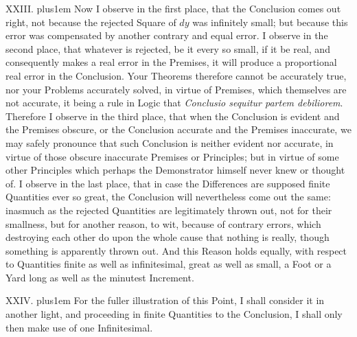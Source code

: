 \medbreak

XXIII. \hskip 0pt plus1em
Now I observe in the first place, that the Conclusion comes out
right, not because the rejected Square of $dy$ was infinitely
small; but because this error was compensated by another contrary
and equal error.  I observe in the second place, that whatever is
rejected, be it every so small, if it be real, and consequently
makes a real error in the Premises, it will produce a
proportional real error in the Conclusion.  Your Theorems
therefore cannot be accurately true, nor your Problems accurately
solved, in virtue of Premises, which themselves are not accurate,
it being a rule in Logic that {\it Conclusio sequitur partem
debiliorem}.  Therefore I observe in the third place, that when
the Conclusion is evident and the Premises obscure, or the
Conclusion accurate and the Premises inaccurate, we may safely
pronounce that such Conclusion is neither evident nor accurate,
in virtue of those obscure inaccurate Premises or Principles; but
in virtue of some other Principles which perhaps the Demonstrator
himself never knew or thought of.  I observe in the last place,
that in case the Differences are supposed finite Quantities ever
so great, the Conclusion will nevertheless come out the same:
inasmuch as the rejected Quantities are legitimately thrown out,
not for their smallness, but for another reason, to wit, because
of contrary errors, which destroying each other do upon the whole
cause that nothing is really, though something is apparently
thrown out.  And this Reason holds equally, with respect to
Quantities finite as well as infinitesimal, great as well as
small, a Foot or a Yard long as well as the minutest Increment.

\medbreak

XXIV. \hskip 0pt plus1em
For the fuller illustration of this Point, I shall consider it in
another light, and proceeding in finite Quantities to the
Conclusion, I shall only then make use of one Infinitesimal.

\midinsert
\centerline{}
\endinsert

